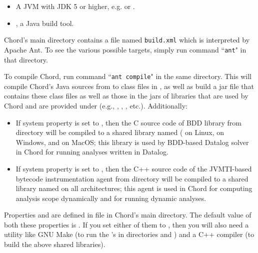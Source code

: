 \begin{itemize}
\item
A JVM with JDK 5 or higher, e.g.
 or
.
\item
{}, a Java build tool.
\end{itemize}

Chord's main directory contains a file named {\tt build.xml} which is
interpreted by Apache Ant.  To see the various possible targets,
simply run command ``{\tt ant}" in that directory.

To compile Chord, run command ``{\tt ant compile}" in the same directory.
This will compile Chord's Java sources from  to class
files in , as well as build a jar file
 that contains these class files as well as those
in the jars of libraries that are used by Chord and are
provided under  (e.g., ,
, , etc.).  Additionally:

\begin{itemize}
\item

If system property  is set to , then
the C source code of BDD library
 from directory 
will be compiled to a shared library named
( on Linux,  on Windows, and
 on MacOS; this library is used by BDD-based
Datalog solver  in
Chord for running analyses written in Datalog.

\item

If system property  is set to , then
the C++ source code of the JVMTI-based bytecode instrumentation agent
from directory  will be compiled to a shared library named
 on all architectures;
this agent is used in Chord for computing analysis scope dynamically
and for running dynamic analyses.
\end{itemize}

Properties  and  are
defined in file  in Chord's main directory.
The default value of both these properties is .  If you set
either of them to , then you will also need a utility like
GNU Make (to run the 's in directories  and
) and a C++ compiler (to build the above shared libraries).

